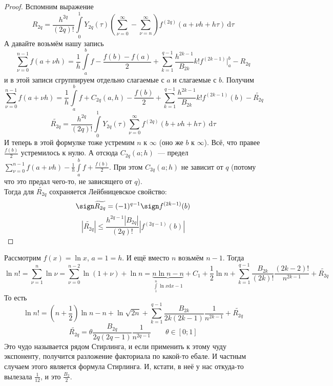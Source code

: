 \documentclass{article}
\begin{document}
    \begin{proof}
        Вспомним выражение
        $$
        R_{2q}=\frac{h^{2q}}{(2q)!}\int\limits_0^1Y_{2q}(\tau)\left(\sum\limits_{\nu=0}^\infty-\sum\limits_{\nu=n}^\infty\right)f^{(2q)}(a+\nu h+h\tau)~\mathrm d\tau
        $$
        А давайте возьмём нашу запись
        $$
        \sum\limits_{\nu=0}^{n-1}f(a+\nu h)=\frac1h\int\limits_a^bf-\frac{f(b)-f(a)}2+\sum\limits_{k=1}^{q-1}\frac{h^{2k-1}}{B_{2k}}{k!}f^{(2k-1)}\bigg|_a^b-R_{2q}
        $$
        и в этой записи сгруппируем отдельно слагаемые с $a$ и слагаемые с $b$. Получим
        $$
        \sum\limits_{\nu=0}^{n-1}f(a+\nu h)=\frac1h\int\limits_a^bf+C_{2q}(a,h)-\frac{f(b)}2+\sum\limits_{k=1}^{q-1}\frac{h^{2k-1}}{B_{2k}}{k!}f^{(2k-1)}(b)-\widetilde{R_{2q}}
        $$
        $$
        \widetilde{R_{2q}}=\frac{h^{2q}}{(2q)!}\int\limits_0^1Y_{2q}(\tau)\sum\limits_{\nu=0}^\infty f^{(2q)}(b+\nu h+h\tau)~\mathrm d\tau
        $$
        И теперь в этой формулке тоже устремим $n$ к $\infty$ (оно же $b$ к $\infty$). Всё, что правее $\frac{f(b)}2$ устремилось к нулю. А отсюда $C_{2q}(a;h)$~--- предел $\sum\limits_{\nu=0}^{n-1}f(a+\nu h)-\frac1h\int\limits_a^bf+\frac{f(b)}2$.
        При этом $C_{2q}(a;h)$ не зависит от $q$ (потому что это предал чего-то, не зависящего от $q$).\\
        Тогда для $\widetilde{R_{2q}}$ сохраняется Лейбницевское свойство:
        $$
        \sign\widetilde{R_{2q}}=(-1)^{q-1}\sign f^{(2k-1)}(b)
        $$
        $$
        |\widetilde{R_{2q}}|\leqslant\frac{h^{2q-1}|B_{2q}|}{(2q)!}\left|f^{(2q-1)}(b)\right|
        $$
    \end{proof}
    \begin{example}
        Рассмотрим $f(x)=\ln x$, $a=1=h$. И ещё вместо $n$ возьмём $n-1$. Тогда
        $$
        \ln n!=\sum\limits_{\nu=1}^n\ln\nu=\sum\limits_{\nu=0}^{n-2}\ln(1+\nu)+\ln n=\underbrace{n\ln n-n}_{\int\limits_1^n\ln x\mathrm dx-1}+C_1+\frac12\ln n+\sum\limits_{k=1}^{q-1}\frac{B_{2k}}{(2k)!}\frac{(2k-2)!}{n^{2k-1}}+\widetilde{R_{2q}}
        $$
        То есть
        $$
        \ln n!=\left(n+\frac12\right)\ln n-n+\ln\sqrt{2n}+\sum\limits_{k=1}^{q-1}\frac{B_{2k}}{2k(2k-1)}\frac1{n^{2k-1}}+\widetilde{R_{2q}}
        $$
        $$
        \widetilde{R_{2q}}=\theta\frac{B_{2q}}{2q(2q-1)}\frac1{n^{2q-1}}\qquad\theta\in[0;1]
        $$
        Это чудо называется рядом Стирлинга, и если применить к этому чуду экспоненту, получится разложение факториала по какой-то ебале. И частным случаем этого является формула Стирлинга. И, кстати, в неё у нас откуда-то вылезала $\frac1{12}$, и это $\frac{B_2}2$.
    \end{example}
\end{document}
